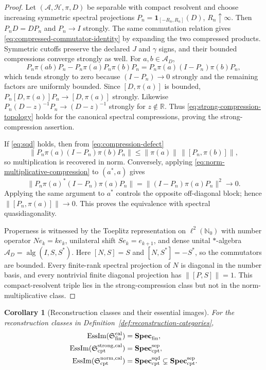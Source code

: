 \documentclass[11pt]{article}
\newtheorem{corollary}[corollary]{Corollary}
\theoremstyle{definition}
\theoremstyle{remark}
\theoremstyle{definition}
\theoremstyle{remark}
\newcommand{\N}{\mathbb N}
\newcommand{\A}{\mathcal A}
\newcommand{\Hh}{\mathcal H}
\newcommand{\EssIm}{\operatorname{EssIm}}
\begin{document}
\begin{proof}
Let $(\A,\Hh,\pi,D)$ be separable with compact resolvent and choose increasing
symmetric spectral projections
$P_n=\mathbf 1_{[-R_n,R_n]}(D)$, $R_n\uparrow\infty$.  Then
$P_nD=DP_n$ and $P_n\to I$ strongly.  The same commutation relation gives
\eqref{eq:compressed-commutator-identity} by expanding the two compressed products.
Symmetric cutoffs preserve the declared $J$ and $\gamma$ signs, and their bounded
compressions converge strongly as well.  For $a,b\in\A_D$,
\begin{equation}
 P_n\pi(ab)P_n-P_n\pi(a)P_n\pi(b)P_n
 =P_n\pi(a)(I-P_n)\pi(b)P_n,
 \label{eq:compression-defect}
\end{equation}
which tends strongly to zero because $(I-P_n)\to0$ strongly and the remaining
factors are uniformly bounded.  Since $[D,\pi(a)]$ is bounded,
$P_n[D,\pi(a)]P_n\to[D,\pi(a)]$ strongly.  Likewise
$P_n(D-z)^{-1}P_n\to(D-z)^{-1}$ strongly for $z\notin\mathbb R$.
Thus \eqref{eq:strong-compression-topology} holds for the canonical spectral
compressions, proving the strong-compression assertion.

If \eqref{eq:sqd} holds, then from \eqref{eq:compression-defect}
\[
 \|P_n\pi(a)(I-P_n)\pi(b)P_n\|
 \le \|\pi(a)\|\,\|[P_n,\pi(b)]\|,
\]
so multiplication is recovered in norm.  Conversely, applying
\eqref{eq:norm-multiplicative-compression} to $(a^*,a)$ gives
\[
 \|P_n\pi(a)^*(I-P_n)\pi(a)P_n\|
 =\|(I-P_n)\pi(a)P_n\|^2\longrightarrow0.
\]
Applying the same argument to $a^*$ controls the opposite off-diagonal block;
hence $\|[P_n,\pi(a)]\|\to0$.  This proves the equivalence with spectral quasidiagonality.

Properness is witnessed by the Toeplitz representation on $\ell^2(\N_0)$ with
number operator $Ne_k=ke_k$, unilateral shift $Se_k=e_{k+1}$, and dense unital
$*$-algebra $\A_D=\operatorname{alg}(I,S,S^*)$.  Here
$[N,S]=S$ and $[N,S^*]=-S^*$, so the commutators are bounded.  Every finite-rank
spectral projection of $N$ is diagonal in the number basis, and every nontrivial
finite diagonal projection has $\|[P,S]\|=1$.  This compact-resolvent triple lies
in the strong-compression class but not in the norm-multiplicative class.
\end{proof}

\begin{corollary}[Reconstruction classes and their essential images]
\label{thm:essential-image}
For the reconstruction classes in Definition~\ref{def:reconstruction-categories},
\begin{equation}
 \begin{aligned}
 \EssIm(\mathfrak S_{\rm fin}^{\rm cal})
   &=\mathbf{Spec}_{\rm fin},\\
 \EssIm(\mathfrak S_{\rm cpt}^{\rm strong,cal})
   &=\mathbf{Spec}_{\rm cpt}^{\rm sep},\\
 \EssIm(\mathfrak S_{\rm cpt}^{\rm norm,cal})
   &=\mathbf{Spec}_{\rm cpt}^{\rm sqd}
   \subsetneq\mathbf{Spec}_{\rm cpt}^{\rm sep}.
 \end{aligned}
 \label{eq:essential-image}
\end{equation}
\end{corollary}
\end{document}

